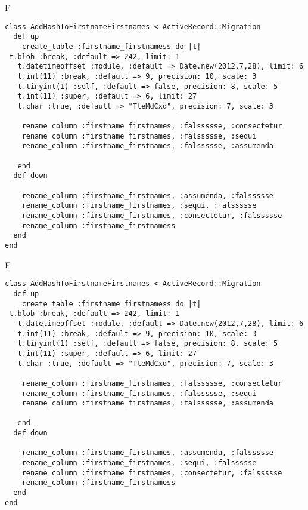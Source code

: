 F
\begin{verbatim}
class AddHashToFirstnameFirstnames < ActiveRecord::Migration
  def up
    create_table :firstname_firstnamess do |t| 
 t.blob :break, :default => 242, limit: 1
   t.datetimeoffset :module, :default => Date.new(2012,7,28), limit: 6
   t.int(11) :break, :default => 9, precision: 10, scale: 3
   t.tinyint(1) :self, :default => false, precision: 8, scale: 5
   t.int(11) :super, :default => 6, limit: 27
   t.char :true, :default => "TteMdCxd", precision: 7, scale: 3

    rename_column :firstname_firstnames, :falssssse, :consectetur
    rename_column :firstname_firstnames, :falssssse, :sequi
    rename_column :firstname_firstnames, :falssssse, :assumenda

   end
  def down

    rename_column :firstname_firstnames, :assumenda, :falssssse
    rename_column :firstname_firstnames, :sequi, :falssssse
    rename_column :firstname_firstnames, :consectetur, :falssssse
    rename_column :firstname_firstnamess
  end
end
\end{verbatim}

F
\begin{verbatim}
class AddHashToFirstnameFirstnames < ActiveRecord::Migration
  def up
    create_table :firstname_firstnamess do |t| 
 t.blob :break, :default => 242, limit: 1
   t.datetimeoffset :module, :default => Date.new(2012,7,28), limit: 6
   t.int(11) :break, :default => 9, precision: 10, scale: 3
   t.tinyint(1) :self, :default => false, precision: 8, scale: 5
   t.int(11) :super, :default => 6, limit: 27
   t.char :true, :default => "TteMdCxd", precision: 7, scale: 3

    rename_column :firstname_firstnames, :falssssse, :consectetur
    rename_column :firstname_firstnames, :falssssse, :sequi
    rename_column :firstname_firstnames, :falssssse, :assumenda

   end
  def down

    rename_column :firstname_firstnames, :assumenda, :falssssse
    rename_column :firstname_firstnames, :sequi, :falssssse
    rename_column :firstname_firstnames, :consectetur, :falssssse
    rename_column :firstname_firstnamess
  end
end
\end{verbatim}


